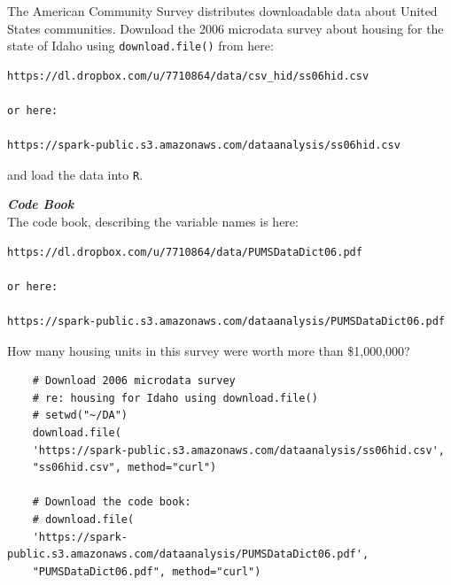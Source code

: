 \documentclass{beamer}
\begin{document}
\begin{frame}[fragile]
The American Community Survey distributes downloadable data about United States communities. 
Download the 2006 microdata survey about housing for the state of Idaho using \texttt{download.file()} from here: 

\begin{verbatim}
https://dl.dropbox.com/u/7710864/data/csv_hid/ss06hid.csv

or here:

https://spark-public.s3.amazonaws.com/dataanalysis/ss06hid.csv 
\end{verbatim}
and load the data into \texttt{R}. 
\end{frame}

\begin{frame}[fragile]
\noindent \textbf{\textit{Code Book}}\\
The code book, describing the variable names is here: 

\begin{verbatim}
https://dl.dropbox.com/u/7710864/data/PUMSDataDict06.pdf

or here: 

https://spark-public.s3.amazonaws.com/dataanalysis/PUMSDataDict06.pdf
\end{verbatim}
\end{frame}
\begin{frame}[fragile]

How many housing units in this survey were worth more than \$1,000,000?

\begin{framed}
	\begin{verbatim}
	# Download 2006 microdata survey 
	# re: housing for Idaho using download.file()
	# setwd("~/DA")
	download.file(
	'https://spark-public.s3.amazonaws.com/dataanalysis/ss06hid.csv',
	"ss06hid.csv", method="curl")
	
	# Download the code book:
	# download.file(
	'https://spark-public.s3.amazonaws.com/dataanalysis/PUMSDataDict06.pdf',
	"PUMSDataDict06.pdf", method="curl")
	\end{verbatim}
\end{framed}

\end{frame}
\end{document}
